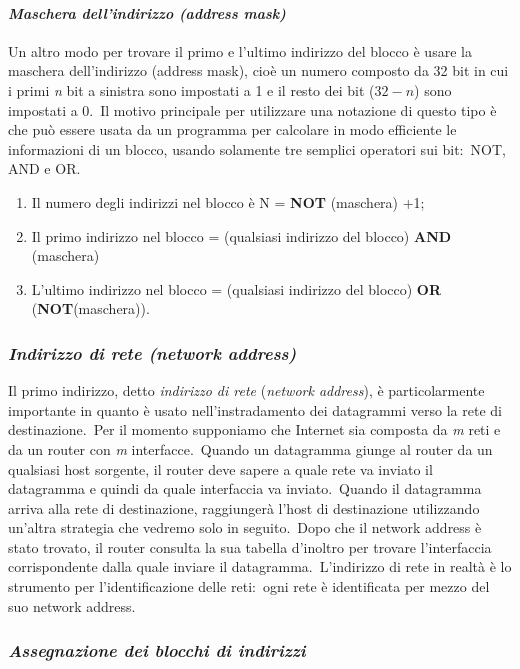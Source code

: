 \paragraph{\emph{Maschera dell'indirizzo (address mask)}}

Un altro modo per trovare il primo e l'ultimo indirizzo del blocco è usare la maschera dell'indirizzo (address mask), cioè un numero composto da 32 bit in cui i primi \emph{n} bit a sinistra sono impostati a 1 e il resto dei bit ($32-n$) sono impostati a 0.\
Il motivo principale per utilizzare una notazione di questo tipo è che può essere usata da un programma per calcolare in modo efficiente le informazioni di un blocco, usando solamente tre semplici operatori sui bit:\ NOT, AND e OR.

\begin{enumerate}
    \item Il numero degli indirizzi nel blocco è N = \textbf{NOT} (maschera) +1;
    \item Il primo indirizzo nel blocco = (qualsiasi indirizzo del blocco) \textbf{AND} (maschera)
    \item L'ultimo indirizzo nel blocco = (qualsiasi indirizzo del blocco) \textbf{OR} (\textbf{NOT}(maschera)).\
\end{enumerate}

\subsubsection{\emph{Indirizzo di rete (network address)}}

Il primo indirizzo, detto \emph{indirizzo di rete} (\emph{network address}), è particolarmente importante in quanto è usato nell'instradamento dei datagrammi verso la rete di destinazione.\
Per il momento supponiamo che Internet sia composta da \emph{m} reti e da un router con \emph{m} interfacce.\
Quando un datagramma giunge al router da un qualsiasi host sorgente, il router deve sapere a quale rete va inviato il datagramma e quindi da quale interfaccia va inviato.\
Quando il datagramma arriva alla rete di destinazione, raggiungerà l'host di destinazione utilizzando un'altra strategia che vedremo solo in seguito.\
Dopo che il network address è stato trovato, il router consulta la sua tabella d'inoltro per trovare l'interfaccia corrispondente dalla quale inviare il datagramma.\
L'indirizzo di rete in realtà è lo strumento per l'identificazione delle reti:\ ogni rete è identificata per mezzo del suo network address.

\subsubsection{\emph{Assegnazione dei blocchi di indirizzi}}

